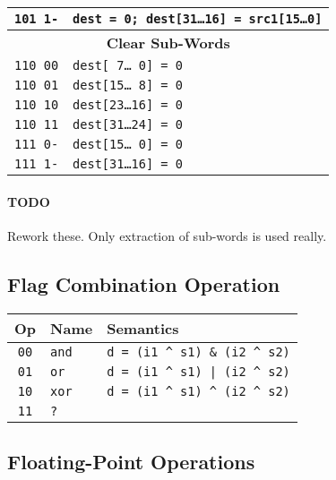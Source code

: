 \documentclass[10pt,DIV12]{scrartcl}
\begin{document}
\begin{tabular}{cl}
\texttt{101 1-} & \texttt{dest = 0; dest[31\ldots{}16] = src1[15\ldots{}0]} \\
\midrule
\multicolumn{2}{c}{\textsf{\textbf{Clear Sub-Words}}} \\
\cmidrule{1-2}
\texttt{110 00} & \texttt{dest[ 7\ldots{}\ 0] = 0} \\
\texttt{110 01} & \texttt{dest[15\ldots{}\ 8] = 0} \\
\texttt{110 10} & \texttt{dest[23\ldots{}16] = 0} \\
\texttt{110 11} & \texttt{dest[31\ldots{}24] = 0} \\
\cmidrule{1-2}
\texttt{111 0-} & \texttt{dest[15\ldots{}\ 0] = 0} \\
\texttt{111 1-} & \texttt{dest[31\ldots{}16] = 0} \\
\bottomrule  
\end{tabular}

\paragraph{TODO} Rework these. Only extraction of sub-words is used really.

\subsection{Flag Combination Operation}
\label{sec:comb}

\begin{tabular}{cll}
\toprule
Op & Name & Semantics \\
\midrule
\texttt{00} & \texttt{and} & \texttt{d = (i1 \textasciicircum{} s1) \& (i2 \textasciicircum{} s2)} \\
\texttt{01} & \texttt{or} & \texttt{d = (i1 \textasciicircum{} s1) | (i2 \textasciicircum{} s2)} \\
\texttt{10} & \texttt{xor} & \texttt{d = (i1 \textasciicircum{} s1) \textasciicircum{} (i2 \textasciicircum{} s2)} \\
\texttt{11} & \texttt{?} & \\
\bottomrule  
\end{tabular}


\pagebreak

\subsection{Floating-Point Operations}
\label{sec:fop}
\end{document}
